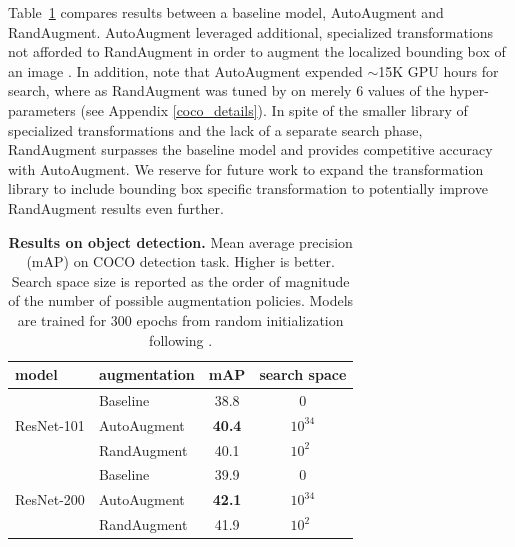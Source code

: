Table~\ref{tab:coco_results} compares results between a baseline model, AutoAugment and RandAugment. AutoAugment leveraged additional, specialized transformations not afforded to RandAugment in order to augment the localized bounding box of an image \cite{zoph2019learning}. In addition, note that AutoAugment expended $\sim$15K GPU hours for search, where as RandAugment was tuned by on merely 6 values of the hyper-parameters (see Appendix \ref{coco_details}). In spite of the smaller library of specialized transformations and the lack of a separate search phase, RandAugment surpasses the baseline model and provides competitive accuracy with AutoAugment. We reserve for future work to expand the transformation library to include bounding box specific transformation to potentially improve RandAugment results even further.

\begin{table}[t]
\centering
\small
\begin{tabular}{llcc}
  \hline
  model & augmentation &  mAP  & search space\\  
  \hline 
  &Baseline  & 38.8 & 0\\
  ResNet-101 &AutoAugment  & \textbf{40.4}& $10^{34}$\\
  &RandAugment & 40.1 & $10^{2\,\,\,}$\\
  \hline
   &Baseline  & 39.9 & 0\\
  ResNet-200 &AutoAugment  & \textbf{42.1} & $10^{34}$\\
  &RandAugment & 41.9 & $10^{2\,\,\,}$\\
  \hline 
\end{tabular}
\caption{\textbf{Results on object detection.} Mean average precision (mAP) on COCO detection task. Higher is better. Search space size is reported as the order of magnitude of the number of possible augmentation policies. Models are trained for 300 epochs from random initialization following \cite{zoph2019learning}.}
\label{tab:coco_results}  
\end{table}

